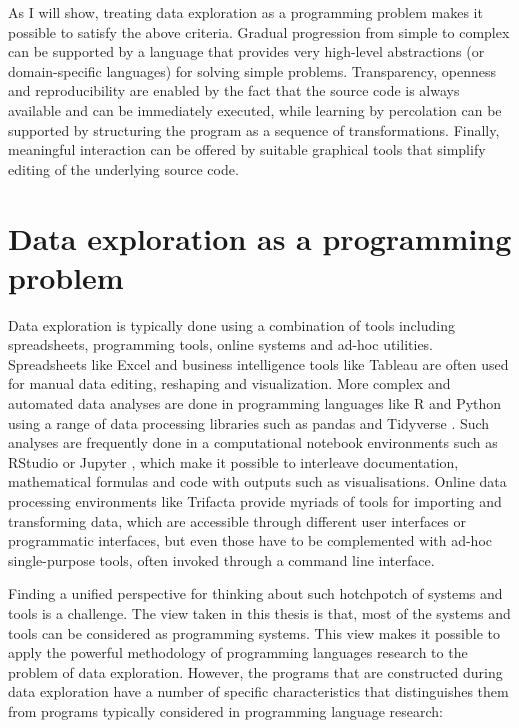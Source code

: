 \documentclass[fleqn,11pt]{report}
\theoremstyle{definition}
\begin{document}
As I will show, treating data exploration as a programming problem makes it possible to satisfy
the above criteria. Gradual progression from simple to complex can be supported by a language
that provides very high-level abstractions (or domain-specific languages) for solving simple
problems. Transparency, openness and reproducibility are enabled by the fact that the source code
is always available and can be immediately executed, while learning
by percolation can be supported by structuring the program as a sequence of transformations.
Finally, meaningful interaction can be offered by suitable graphical tools that simplify editing
of the underlying source code.

\section{Data exploration as a programming problem}

Data exploration is typically done using a combination of tools including spreadsheets,
programming tools, online systems and ad-hoc utilities. Spreadsheets like Excel and business
intelligence tools like Tableau \citep{wesley-2011-tableau} are often used for manual data
editing, reshaping and visualization. More complex and automated data analyses are done in
programming languages like R and Python using a range of data processing libraries such as pandas
and Tidyverse \citep{wickham-2019-tidyverse}. Such analyses are frequently done in a computational
notebook environments such as RStudio or Jupyter \citep{kluyver-2016-jupyter}, which make
it possible to interleave documentation, mathematical formulas and code with outputs such as
visualisations. Online data processing environments like Trifacta provide myriads of tools for
importing and transforming data, which are accessible through different user interfaces or
programmatic interfaces, but even those have to be complemented with ad-hoc single-purpose tools,
often invoked through a command line interface.

Finding a unified perspective for thinking about such hotchpotch of systems and tools
is a challenge. The view taken in this thesis is that, most of the systems and tools can be
considered as programming systems. This view makes it possible to apply the powerful methodology
of programming languages research to the problem of data exploration.
However, the programs that are constructed during data exploration have a number of specific
characteristics that distinguishes them from programs typically considered in programming
language research:
\end{document}
